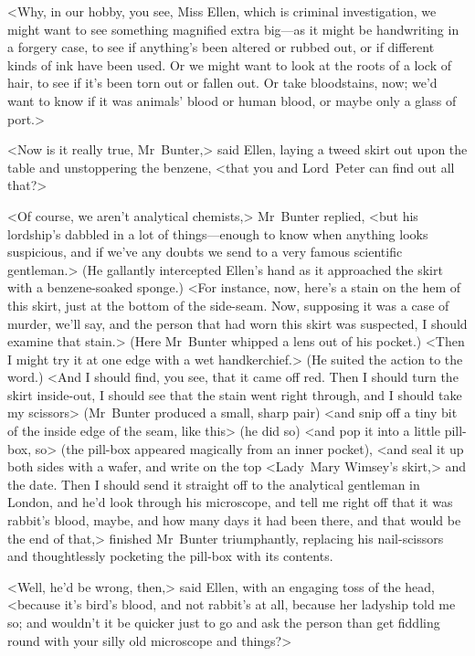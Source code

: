 <Why, in our hobby, you see, Miss Ellen, which is criminal investigation, we might want to see something magnified extra big—as it might be handwriting in a forgery case, to see if anything's been altered or rubbed out, or if different kinds of ink have been used. Or we might want to look at the roots of a lock of hair, to see if it's been torn out or fallen out. Or take bloodstains, now; we'd want to know if it was animals' blood or human blood, or maybe only a glass of port.>

<Now is it really true, Mr~Bunter,> said Ellen, laying a tweed skirt out upon the table and unstoppering the benzene, <that you and Lord~Peter can find out all that?>

<Of course, we aren't analytical chemists,> Mr~Bunter replied, <but his lordship's dabbled in a lot of things—enough to know when anything looks suspicious, and if we've any doubts we send to a very famous scientific gentleman.> (He gallantly intercepted Ellen's hand as it approached the skirt with a benzene-soaked sponge.) <For instance, now, here's a stain on the hem of this skirt, just at the bottom of the side-seam. Now, supposing it was a case of murder, we'll say, and the person that had worn this skirt was suspected, I should examine that stain.> (Here Mr~Bunter whipped a lens out of his pocket.) <Then I might try it at one edge with a wet handkerchief.> (He suited the action to the word.) <And I should find, you see, that it came off red.  Then I should turn the skirt inside-out, I should see that the stain went right through, and I should take my scissors> (Mr~Bunter produced a small, sharp pair) <and snip off a tiny bit of the inside edge of the seam, like this> (he did so) <and pop it into a little pill-box, so> (the pill-box appeared magically from an inner pocket), <and seal it up both sides with a wafer, and write on the top <Lady~Mary Wimsey's skirt,> and the date. Then I should send it straight off to the analytical gentleman in London, and he'd look through his microscope, and tell me right off that it was rabbit's blood, maybe, and how many days it had been there, and that would be the end of that,> finished Mr~Bunter triumphantly, replacing his nail-scissors and thoughtlessly pocketing the pill-box with its contents.

<Well, he'd be wrong, then,> said Ellen, with an engaging toss of the head, <because it's bird's blood, and not rabbit's at all, because her ladyship told me so; and wouldn't it be quicker just to go and ask the person than get fiddling round with your silly old microscope and things?>


